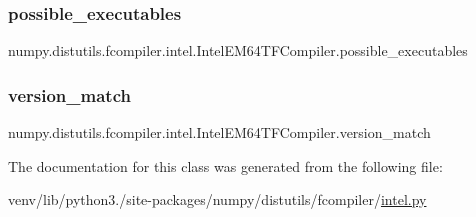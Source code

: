 \subsubsection{\texorpdfstring{possible\+\_\+executables}{possible\_executables}}
{\footnotesize\ttfamily numpy.\+distutils.\+fcompiler.\+intel.\+Intel\+E\+M64\+T\+F\+Compiler.\+possible\+\_\+executables\hspace{0.3cm}{\ttfamily [static]}}

\mbox{\label{classnumpy_1_1distutils_1_1fcompiler_1_1intel_1_1IntelEM64TFCompiler_a0016d19781d00ee8f835515118732c26}} 
\subsubsection{\texorpdfstring{version\+\_\+match}{version\_match}}
{\footnotesize\ttfamily numpy.\+distutils.\+fcompiler.\+intel.\+Intel\+E\+M64\+T\+F\+Compiler.\+version\+\_\+match\hspace{0.3cm}{\ttfamily [static]}}



The documentation for this class was generated from the following file\+:\begin{DoxyCompactItemize}
\item 
venv/lib/python3./site-\/packages/numpy/distutils/fcompiler/\hyperlink{intel_8py}{intel.\+py}\end{DoxyCompactItemize}

